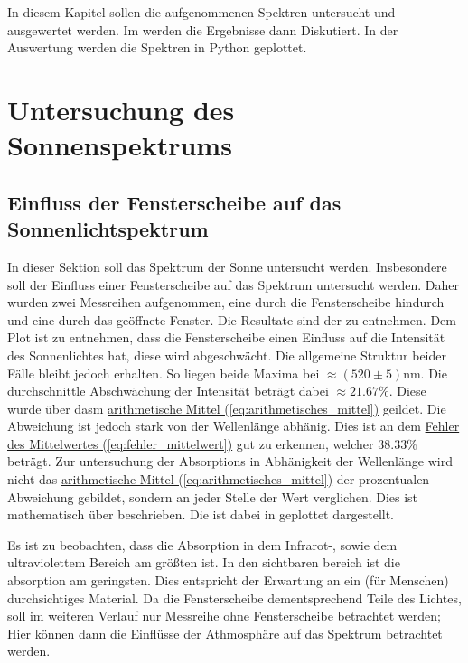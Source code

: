 \newpage
In diesem Kapitel sollen die aufgenommenen Spektren untersucht und ausgewertet werden. Im  werden die Ergebnisse dann Diskutiert. 
In der Auswertung werden die Spektren in Python geplottet.

\section{Untersuchung des Sonnenspektrums}
\label{sec:A1}
\subsection{Einfluss der Fensterscheibe auf das Sonnenlichtspektrum}
In dieser Sektion soll das Spektrum der Sonne untersucht werden. Insbesondere soll der Einfluss einer Fensterscheibe auf das Spektrum untersucht werden. Daher wurden zwei Messreihen aufgenommen, eine durch die Fensterscheibe hindurch und eine durch das geöffnete Fenster. Die Resultate sind der  zu entnehmen.
Dem Plot ist zu entnehmen, dass die Fensterscheibe einen Einfluss auf die Intensität des Sonnenlichtes hat, diese wird abgeschwächt. Die allgemeine Struktur beider Fälle bleibt jedoch erhalten. So liegen beide Maxima bei $\approx (520\pm5) \mathrm{nm}$. Die durchschnittle Abschwächung der Intensität beträgt dabei $\approx 21.67\%$. Diese wurde über dasm \hyperref[eq:arithmetisches_mittel]{arithmetische Mittel (\ref*{eq:arithmetisches_mittel})} geildet. Die Abweichung ist jedoch stark von der Wellenlänge abhänig. Dies ist an dem \hyperref[eq:fehler_mittelwert]{Fehler des Mittelwertes (\ref*{eq:fehler_mittelwert})} gut zu erkennen, welcher $38.33\%$ beträgt. 
Zur untersuchung der Absorptions in Abhänigkeit der Wellenlänge wird nicht das \hyperref[eq:arithmetisches_mittel]{arithmetische Mittel (\ref*{eq:arithmetisches_mittel})} der prozentualen Abweichung gebildet, sondern an jeder Stelle der Wert verglichen. Dies ist mathematisch über
beschrieben. Die  ist dabei in  geplottet dargestellt. 

Es ist zu beobachten, dass die Absorption in dem Infrarot-, sowie dem ultraviolettem Bereich am größten ist. In den sichtbaren bereich ist die absorption am geringsten. Dies entspricht der Erwartung an ein (für Menschen) durchsichtiges Material. 
Da die Fensterscheibe dementsprechend Teile des Lichtes, soll im weiteren Verlauf nur Messreihe ohne Fensterscheibe betrachtet werden; Hier können dann die Einflüsse der Athmosphäre auf das Spektrum betrachtet werden.


